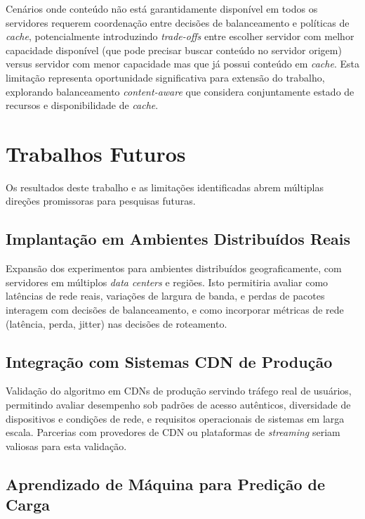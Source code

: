 Cenários onde conteúdo não está garantidamente disponível em todos os servidores requerem coordenação entre decisões de balanceamento e políticas de \textit{cache}, potencialmente introduzindo \textit{trade-offs} entre escolher servidor com melhor capacidade disponível (que pode precisar buscar conteúdo no servidor origem) versus servidor com menor capacidade mas que já possui conteúdo em \textit{cache}. Esta limitação representa oportunidade significativa para extensão do trabalho, explorando balanceamento \textit{content-aware} que considera conjuntamente estado de recursos e disponibilidade de \textit{cache}.

\section{Trabalhos Futuros}

Os resultados deste trabalho e as limitações identificadas abrem múltiplas direções promissoras para pesquisas futuras.

\subsection{Implantação em Ambientes Distribuídos Reais}

Expansão dos experimentos para ambientes distribuídos geograficamente, com servidores em múltiplos \textit{data centers} e regiões. Isto permitiria avaliar como latências de rede reais, variações de largura de banda, e perdas de pacotes interagem com decisões de balanceamento, e como incorporar métricas de rede (latência, perda, jitter) nas decisões de roteamento.

\subsection{Integração com Sistemas CDN de Produção}

Validação do algoritmo em CDNs de produção servindo tráfego real de usuários, permitindo avaliar desempenho sob padrões de acesso autênticos, diversidade de dispositivos e condições de rede, e requisitos operacionais de sistemas em larga escala. Parcerias com provedores de CDN ou plataformas de \textit{streaming} seriam valiosas para esta validação.

\subsection{Aprendizado de Máquina para Predição de Carga}

